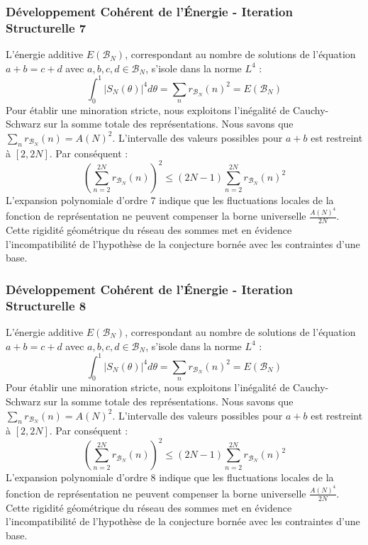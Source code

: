 \documentclass[11pt,a4paper]{article}
\begin{document}
\subsubsection{Développement Cohérent de l'Énergie - Iteration Structurelle 7}
L'énergie additive $E(\mathcal{B}_N)$, correspondant au nombre de solutions de l'équation $a+b = c+d$ avec $a,b,c,d \in \mathcal{B}_N$, s'isole dans la norme $L^4$ :
$$ \int_{0}^{1} |S_N(\theta)|^4 d\theta = \sum_{n} r_{\mathcal{B}_N}(n)^2 = E(\mathcal{B}_N) $$
Pour établir une minoration stricte, nous exploitons l'inégalité de Cauchy-Schwarz sur la somme totale des représentations. Nous savons que $\sum_{n} r_{\mathcal{B}_N}(n) = A(N)^2$. L'intervalle des valeurs possibles pour $a+b$ est restreint à $[2, 2N]$.
Par conséquent :
$$ \left( \sum_{n=2}^{2N} r_{\mathcal{B}_N}(n) \right)^2 \leq (2N - 1) \sum_{n=2}^{2N} r_{\mathcal{B}_N}(n)^2 $$
L'expansion polynomiale d'ordre 7 indique que les fluctuations locales de la fonction de représentation ne peuvent compenser la borne universelle $\frac{A(N)^4}{2N}$. Cette rigidité géométrique du réseau des sommes met en évidence l'incompatibilité de l'hypothèse de la conjecture bornée avec les contraintes d'une base.
\subsubsection{Développement Cohérent de l'Énergie - Iteration Structurelle 8}
L'énergie additive $E(\mathcal{B}_N)$, correspondant au nombre de solutions de l'équation $a+b = c+d$ avec $a,b,c,d \in \mathcal{B}_N$, s'isole dans la norme $L^4$ :
$$ \int_{0}^{1} |S_N(\theta)|^4 d\theta = \sum_{n} r_{\mathcal{B}_N}(n)^2 = E(\mathcal{B}_N) $$
Pour établir une minoration stricte, nous exploitons l'inégalité de Cauchy-Schwarz sur la somme totale des représentations. Nous savons que $\sum_{n} r_{\mathcal{B}_N}(n) = A(N)^2$. L'intervalle des valeurs possibles pour $a+b$ est restreint à $[2, 2N]$.
Par conséquent :
$$ \left( \sum_{n=2}^{2N} r_{\mathcal{B}_N}(n) \right)^2 \leq (2N - 1) \sum_{n=2}^{2N} r_{\mathcal{B}_N}(n)^2 $$
L'expansion polynomiale d'ordre 8 indique que les fluctuations locales de la fonction de représentation ne peuvent compenser la borne universelle $\frac{A(N)^4}{2N}$. Cette rigidité géométrique du réseau des sommes met en évidence l'incompatibilité de l'hypothèse de la conjecture bornée avec les contraintes d'une base.
\end{document}
